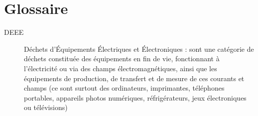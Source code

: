 \chapter{Glossaire}

\begin{description}

\item[DEEE] Déchets d’Équipements Électriques et Électroniques : sont une catégorie de déchets constituée des équipements en fin de vie, fonctionnant à l'électricité ou via des champs électromagnétiques, ainsi que les équipements de production, de transfert et de mesure de ces courants et champs (ce sont surtout des ordinateurs, imprimantes, téléphones portables, appareils photos numériques, réfrigérateurs, jeux électroniques ou télévisions) 



\end{description}